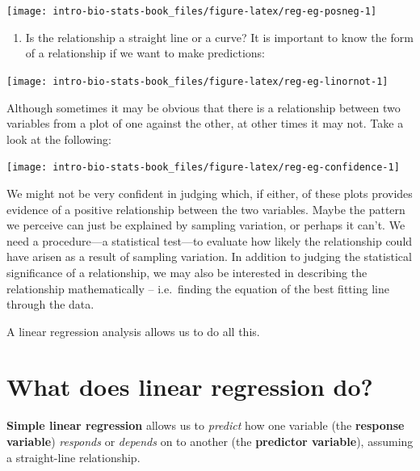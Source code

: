 \documentclass[
]{book}
\providecommand{\tightlist}{%
  \setlength{\itemsep}{0pt}\setlength{\parskip}{0pt}}
\begin{document}
\begin{center}\texttt{[image: intro-bio-stats-book\_files/figure-latex/reg-eg-posneg-1]} \end{center}

\begin{enumerate}
\def\labelenumi{\arabic{enumi}.}
\setcounter{enumi}{2}
\tightlist
\item
  Is the relationship a straight line or a curve? It is important to know the form of a relationship if we want to make predictions:
\end{enumerate}

\begin{center}\texttt{[image: intro-bio-stats-book\_files/figure-latex/reg-eg-linornot-1]} \end{center}

Although sometimes it may be obvious that there is a relationship between two variables from a plot of one against the other, at other times it may not. Take a look at the following:

\begin{center}\texttt{[image: intro-bio-stats-book\_files/figure-latex/reg-eg-confidence-1]} \end{center}

We might not be very confident in judging which, if either, of these plots provides evidence of a positive relationship between the two variables. Maybe the pattern we perceive can just be explained by sampling variation, or perhaps it can't. We need a procedure---a statistical test---to evaluate how likely the relationship could have arisen as a result of sampling variation. In addition to judging the statistical significance of a relationship, we may also be interested in describing the relationship mathematically -- i.e.~finding the equation of the best fitting line through the data.

A linear regression analysis allows us to do all this.

\hypertarget{what-does-linear-regression-do}{%
\section{What does linear regression do?}\label{what-does-linear-regression-do}}

\textbf{Simple linear regression} allows us to \emph{predict} how one variable (the \textbf{response variable}) \emph{responds} or \emph{depends} on to another (the \textbf{predictor variable}), assuming a straight-line relationship.
\end{document}
